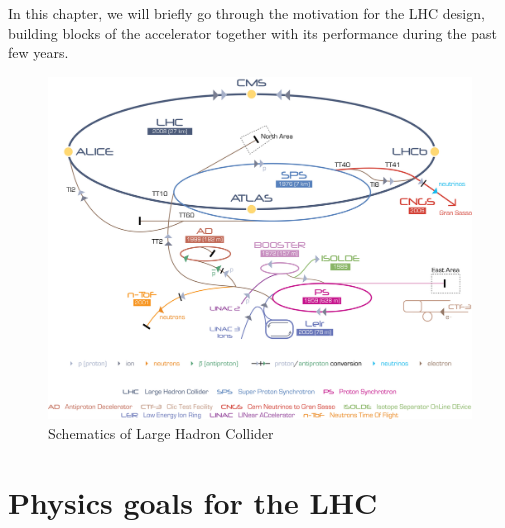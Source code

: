 In this chapter, we will briefly go through the motivation for the LHC design, building blocks of the accelerator together with its performance during the past few years.   
\begin{figure}[htbp]
	\centering
		\includegraphics[width=\textwidth]{Figures/LHC.jpg}
	\caption[Schematics of Large Hadron Collider]{Schematics of Large Hadron Collider}
	\label{fig:LHC}
\end{figure}

\section{Physics goals for the LHC}

